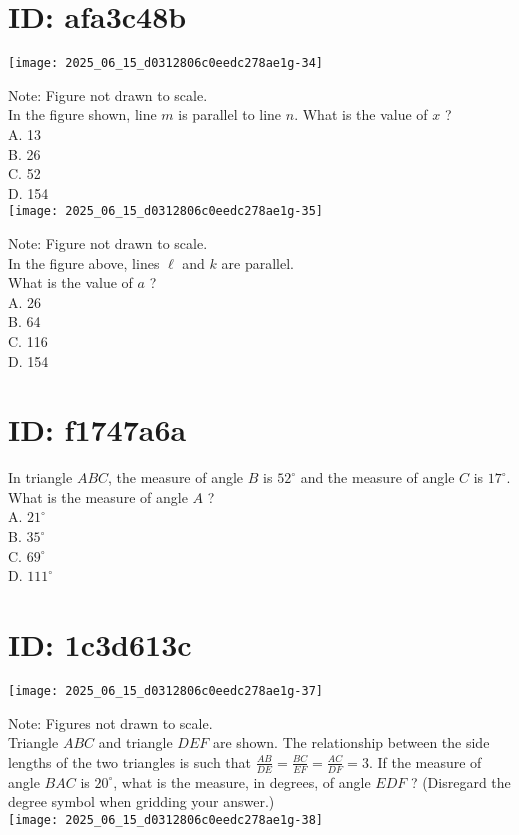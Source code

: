 \section*{ID: afa3c48b}
\begin{center}
\texttt{[image: 2025\_06\_15\_d0312806c0eedc278ae1g-34]}
\end{center}

Note: Figure not drawn to scale.\\
In the figure shown, line $m$ is parallel to line $n$. What is the value of $x$ ?\\
A. 13\\
B. 26\\
C. 52\\
D. 154\\
\texttt{[image: 2025\_06\_15\_d0312806c0eedc278ae1g-35]}

Note: Figure not drawn to scale.\\
In the figure above, lines $\ell$ and $k$ are parallel.\\
What is the value of $a$ ?\\
A. 26\\
B. 64\\
C. 116\\
D. 154

\section*{ID: f1747a6a}
In triangle $A B C$, the measure of angle $B$ is $52^{\circ}$ and the measure of angle $C$ is $17^{\circ}$. What is the measure of angle $A$ ?\\
A. $21^{\circ}$\\
B. $35^{\circ}$\\
C. $69^{\circ}$\\
D. $111^{\circ}$

\section*{ID: 1c3d613c}
\begin{center}
\texttt{[image: 2025\_06\_15\_d0312806c0eedc278ae1g-37]}
\end{center}

Note: Figures not drawn to scale.\\
Triangle $A B C$ and triangle $D E F$ are shown. The relationship between the side lengths of the two triangles is such that $\frac{A B}{D E}=\frac{B C}{E F}=\frac{A C}{D F}=3$. If the measure of angle $B A C$ is $20^{\circ}$, what is the measure, in degrees, of angle $E D F$ ? (Disregard the degree symbol when gridding your answer.)\\
\texttt{[image: 2025\_06\_15\_d0312806c0eedc278ae1g-38]}


